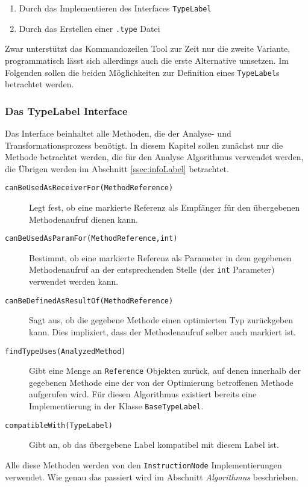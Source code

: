 \begin{enumerate} 
	\item Durch das Implementieren des Interfaces \texttt{TypeLabel}
	\item Durch das Erstellen einer \texttt{.type} Datei
\end{enumerate}

Zwar unterstützt das Kommandozeilen Tool zur Zeit nur die zweite Variante,
programmatisch lässt sich allerdings auch die erste Alternative umsetzen. Im 
Folgenden sollen die beiden Möglichkeiten zur Definition eines \texttt{TypeLabel}s
betrachtet werden.

\subsubsection{Das TypeLabel Interface}

Das Interface beinhaltet alle Methoden, die der Analyse- und Transformationsprozess
benötigt. In diesem Kapitel sollen zunächst nur die Methode betrachtet werden, die
für den Analyse Algorithmus verwendet werden, die Übrigen werden im Abschnitt 
\ref{ssec:infoLabel} betrachtet. 

\begin{description}
	\item[\texttt{canBeUsedAsReceiverFor(MethodReference)}] Legt fest, ob eine 
	markierte Referenz als Empfänger für den übergebenen Methodenaufruf dienen kann.
	\item[\texttt{canBeUsedAsParamFor(MethodReference,int)}] Bestimmt, ob eine 
	markierte Referenz als Parameter in dem gegebenen Methodenaufruf an der 
	entsprechenden Stelle (der \texttt{int} Parameter) verwendet werden kann.
	\item[\texttt{canBeDefinedAsResultOf(MethodReference)}] Sagt aus, ob die 
	gegebene Methode einen optimierten Typ zurückgeben kann. Dies impliziert, dass
	der Methodenaufruf selber auch markiert ist.
	\item[\texttt{findTypeUses(AnalyzedMethod)}] Gibt eine Menge an \texttt{Reference}
	Objekten zurück, auf denen innerhalb der gegebenen Methode eine der von 
	der Optimierung betroffenen Methode aufgerufen wird. Für diesen Algorithmus 
	existiert bereits eine Implementierung in der Klasse \texttt{BaseTypeLabel}.
	\item[\texttt{compatibleWith(TypeLabel)}] Gibt an, ob das übergebene Label 
	kompatibel mit diesem Label ist.
\end{description}

Alle diese Methoden werden von den \texttt{InstructionNode} Implementierungen 
verwendet. Wie genau das passiert wird im Abschnitt \textit{Algorithmus} beschrieben.

